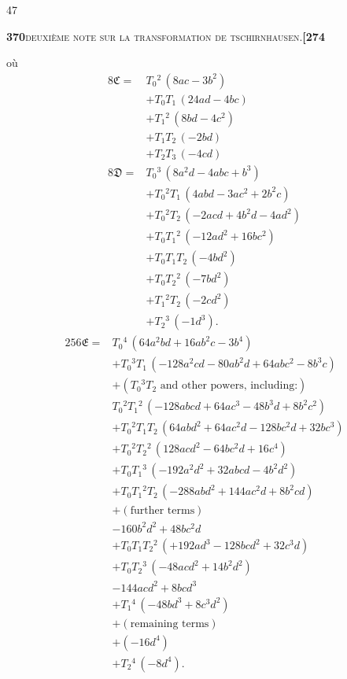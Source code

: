 \documentclass[11pt]{article}
\begin{document}
\hfill 47

\newpage
\noindent\textbf{370}\hfill\textsc{deuxi\`eme note sur la transformation de tschirnhausen.}\hfill\textbf{[274}

\medskip

\noindent o\`u
\[
\begin{aligned}
8\mathfrak{C} = {}& T_0{}^2\,(8 a c - 3 b^2) \\
& + T_0 T_1\,(24 a d - 4 b c) \\
& + T_1{}^2\,(8 b d - 4 c^2) \\
& + T_1 T_2\,(-2 b d) \\
& + T_2 T_3\,(-4 c d) \\[4pt]
8\mathfrak{D} = {}& T_0{}^3\,(8 a^2 d - 4 a b c + b^3) \\
& + T_0{}^2 T_1\,(4 a b d - 3 a c^2 + 2 b^2 c) \\
& + T_0{}^2 T_2\,(-2 a c d + 4 b^2 d - 4 a d^2) \\
& + T_0 T_1{}^2\,(-12 a d^2 + 16 b c^2) \\
& + T_0 T_1 T_2\,(-4 b d^2) \\
& + T_0 T_2{}^2\,(-7 b d^2) \\
& + T_1{}^2 T_2\,(-2 c d^2) \\
& + T_2{}^3\,(-1 d^3).
\end{aligned}
\]
\[
\begin{aligned}
256\mathfrak{E} = {}& T_0{}^4\,(64 a^2 b d + 16 a b^2 c - 3 b^4) \\
& + T_0{}^3 T_1\,(-128 a^2 c d - 80 a b^2 d + 64 a b c^2 - 8 b^3 c) \\
& + (T_0{}^3 T_2 \text{ and other powers, including:}) \\
& T_0{}^2 T_1{}^2\,(-128 a b c d + 64 a c^3 - 48 b^3 d + 8 b^2 c^2) \\
& + T_0{}^2 T_1 T_2\,(64 a b d^2 + 64 a c^2 d - 128 b c^2 d + 32 b c^3) \\
& + T_0{}^2 T_2{}^2\,(128 a c d^2 - 64 b c^2 d + 16 c^4) \\
& + T_0 T_1{}^3\,(-192 a^2 d^2 + 32 a b c d - 4 b^2 d^2) \\
& + T_0 T_1{}^2 T_2\,(-288 a b d^2 + 144 a c^2 d + 8 b^2 c d) \\
& + (\text{further terms}) \\
& - 160 b^2 d^2 + 48 b c^2 d \\
& + T_0 T_1 T_2{}^2\,(+192 a d^3 - 128 b c d^2 + 32 c^3 d) \\
& + T_0 T_2{}^3\,(-48 a c d^2 + 14 b^2 d^2) \\
& - 144 a c d^2 + 8 b c d^3 \\
& + T_1{}^4\,(-48 b d^3 + 8 c^3 d^2) \\
& + (\text{remaining terms}) \\
& + (-16 d^4) \\
& + T_2{}^4\,(-8 d^4).
\end{aligned}
\]
\end{document}
